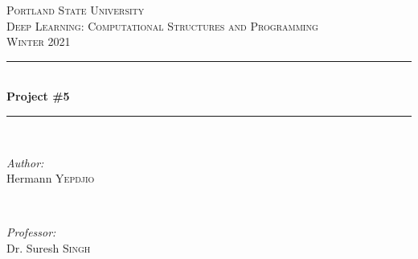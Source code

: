 \documentclass[12pt]{article}
\begin{document}
	
	\begin{titlepage}
		
		\newcommand{\HRule}{\rule{\linewidth}{0.5mm}} %
		
		\center %
		
		
		\textsc{\LARGE Portland State University}\\[1.5cm] %
		\textsc{\Large Deep Learning: Computational Structures and Programming}\\[0.5cm] %
		\textsc{\large Winter 2021}\\[0.5cm] %
		
		
		\HRule \\[0.4cm]
		{ \huge \bfseries Project \#5}\\[0.4cm] %
		\HRule \\[1.5cm]
		
		
		\begin{minipage}{0.4\textwidth}
			\begin{flushleft} \large
				\emph{Author:}\\
				Hermann \textsc{Yepdjio} %
			\end{flushleft}
		\end{minipage}
		~
		\begin{minipage}{0.4\textwidth}
			\begin{flushright} \large
				\emph{Professor:} \\
				Dr. Suresh \textsc{Singh} %
			\end{flushright}
		\end{minipage}\\[1cm]
		

\end{titlepage}
\end{document}
